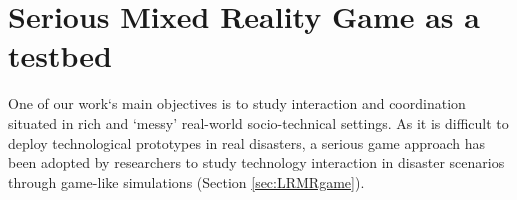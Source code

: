 




\section{Serious Mixed Reality Game as a testbed} \label{sec:SMRG}
One of our work`s main objectives is to study interaction and coordination situated in rich and `messy' real-world socio-technical settings. As it is difficult to deploy technological prototypes in real disasters, a serious game approach has been adopted by researchers to study technology interaction in disaster scenarios through game-like simulations (Section \ref{sec:LRMRgame}).

